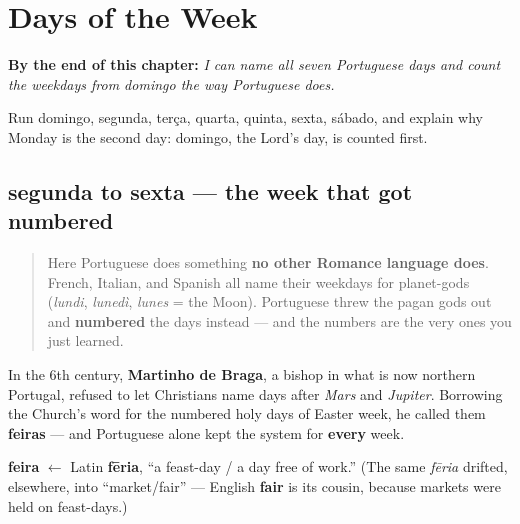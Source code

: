 
\chapter{Days of the Week}
\label{ch:pt-days-of-the-week}

\begin{chapteropening}
\textbf{By the end of this chapter:} \emph{I can name all seven Portuguese days and count the weekdays from domingo the way Portuguese does.}

Run domingo, segunda, terça, quarta, quinta, sexta, sábado, and explain why Monday is the second day: domingo, the Lord's day, is counted first.
\end{chapteropening}

\section[segunda, terça, quarta, quinta, sexta …]{segunda to sexta — the week that got numbered}

\label{lesson:PT-C07-dias-1}



\begin{quote}
Here Portuguese does something \textbf{no other Romance language does}. French, Italian, and Spanish all name their weekdays for planet-gods (\emph{lundi}, \emph{lunedì}, \emph{lunes} = the Moon). Portuguese threw the pagan gods out and \textbf{numbered} the days instead — and the numbers are the very ones you just learned.
\end{quote}

\begin{culture}
In the 6th century, \textbf{Martinho de Braga}, a bishop in what is now northern Portugal, refused to let Christians name days after \emph{Mars} and \emph{Jupiter}. Borrowing the Church's word for the numbered holy days of Easter week, he called them \textbf{feiras} — and Portuguese alone kept the system for \textbf{every} week.

\textbf{feira} $\leftarrow$ Latin \textbf{fēria}, \textquotedblleft{}a feast-day / a day free of work.\textquotedblright{} (The same \emph{fēria} drifted, elsewhere, into \textquotedblleft{}market/fair\textquotedblright{} — English \textbf{fair} is its cousin, because markets were held on feast-days.)
\end{culture}

